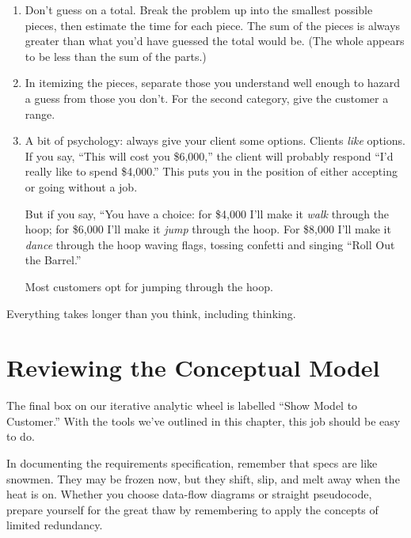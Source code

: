 \begin{enumerate}

\item Don't guess on a total. Break the problem up into the smallest
possible pieces, then estimate the time for each piece. The sum of the
pieces is always greater than what you'd have guessed the total would
be. (The whole appears to be less than the sum of the parts.)

\item In itemizing the pieces, separate those you understand well
enough to hazard a guess from those you don't. For the second
category, give the customer a range.

\item A bit of psychology: always give your client some options.
Clients \emph{like} options. If you say, ``This will cost you \$6,000,''
the client will probably respond ``I'd really like to spend \$4,000.''
This puts you in the position of either accepting or going without a job.

But if you say, ``You have a choice: for \$4,000 I'll make it
\emph{walk} through the hoop; for \$6,000 I'll make it \emph{jump}
through the hoop. For \$8,000 I'll make it \emph{dance} through the
hoop waving flags, tossing confetti and singing ``Roll Out the Barrel.''

Most customers opt for jumping through the hoop.
\end{enumerate}

\begin{tip}
Everything takes longer than you think, including thinking.
\end{tip}%
%
%
%

\section{Reviewing the Conceptual Model}%
%

The final box on our iterative analytic wheel is labelled ``Show Model
to Customer.'' With the tools we've outlined in this chapter, this job
should be easy to do.

In documenting the requirements specification, remember that specs are
like snowmen. They may be frozen now, but they shift, slip, and melt
away when the heat is on. Whether you choose data-flow diagrams or
straight \Forth{} pseudocode, prepare yourself for the great thaw by
remembering to apply the concepts of limited redundancy.

